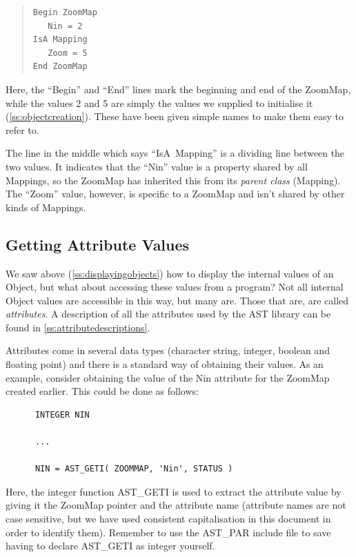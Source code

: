 \documentclass[twoside,11pt]{article}
\newcommand{\htmlref}[2]{#1}
\newcommand{\appref}[1]{Appendix~\ref{#1}}
\newcommand{\secref}[1]{\S\ref{#1}}
\renewcommand{\appref}[1]{\ref{#1}}
\renewcommand{\secref}[1]{\ref{#1}}
\begin{document}
\begin{quote}
\small
\begin{verbatim}
Begin ZoomMap
   Nin = 2
IsA Mapping
   Zoom = 5
End ZoomMap
\end{verbatim}
\normalsize
\end{quote}

Here, the ``Begin'' and ``End'' lines mark the beginning and end of
the ZoomMap, while the values 2 and 5 are simply the values we
supplied to initialise it (\secref{ss:objectcreation}). These have
been given simple names to make them easy to refer to.

The line in the middle which says ``IsA~\htmlref{Mapping}{Mapping}'' is a dividing line
between the two values. It indicates that the ``\htmlref{Nin}{Nin}'' value is a
property shared by all Mappings, so the ZoomMap has inherited this
from its {\em{parent class}} (Mapping). The ``\htmlref{Zoom}{Zoom}'' value, however,
is specific to a ZoomMap and isn't shared by other kinds of Mappings.

\subsection{\label{ss:gettingattributes}Getting Attribute Values}

We saw above (\secref{ss:displayingobjects}) how to display the
internal values of an \htmlref{Object}{Object}, but what about accessing these values
from a program?  Not all internal Object values are accessible in this
way, but many are. Those that are, are called {\em{attributes}}. A
description of all the attributes used by the AST library can be found
in \appref{ss:attributedescriptions}.

Attributes come in several data types (character string, integer,
boolean and floating point) and there is a standard way of obtaining
their values. As an example, consider obtaining the value of the \htmlref{Nin}{Nin}
attribute for the \htmlref{ZoomMap}{ZoomMap} created earlier. This could be done as
follows:

\small
\begin{verbatim}
      INTEGER NIN

      ...

      NIN = AST_GETI( ZOOMMAP, 'Nin', STATUS )
\end{verbatim}
\normalsize

Here, the integer function AST\_GETI is used to extract the attribute
value by giving it the ZoomMap pointer and the attribute name
(attribute names are not case sensitive, but we have used consistent
capitalisation in this document in order to identify them). Remember
to use the AST\_PAR include file to save having to declare AST\_GETI
as integer yourself.
\end{document}

